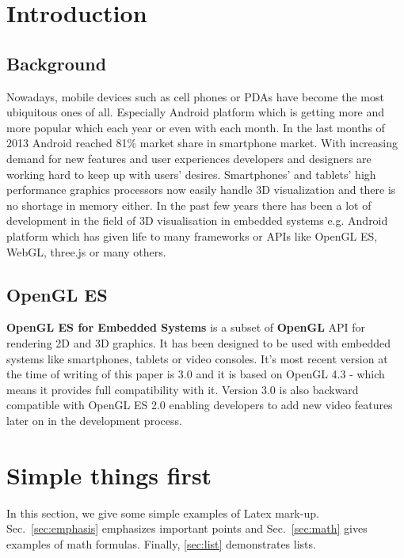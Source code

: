 \documentclass[a4paper,12pt]{article}
\begin{document}
\section{Introduction}

\subsection{Background}
Nowadays, mobile devices such as cell phones or PDAs have become the most ubiquitous ones of all.
Especially Android platform which is getting more and more popular which each year or even with each month.
In the last months of 2013 Android reached 81\% market share in smartphone market. 
With increasing demand for new features and user experiences developers and designers are working hard to keep up with users' desires.
Smartphones’ and tablets’ high performance graphics processors now easily handle 3D visualization and there is no shortage in memory either. 
In the past few years there has been a lot of development in the field of 3D visualisation in embedded systems e.g. Android platform which has given life to many frameworks or APIs like OpenGL ES, WebGL, three.js or many others.


\subsection{OpenGL ES}
\textbf{OpenGL ES for Embedded Systems} is a subset of \textbf{OpenGL} API for rendering 2D and 3D graphics.
It has been designed to be used with embedded systems like smartphones, tablets or video consoles.
It's most recent version at the time of writing of this paper is 3.0 and it is based on OpenGL 4.3 - which means it provides full compatibility with it. 
Version 3.0 is also backward compatible with OpenGL ES 2.0 enabling developers to add new video features later on in the development process.


\pagebreak[4]
\section{Simple things first}

In this section, we give some simple examples of Latex mark-up.
Sec.~\ref{sec:emphasis} emphasizes important points and
Sec.~\ref{sec:math} gives examples of math formulas.
Finally, \ref{sec:list} demonstrates lists.
\end{document}
